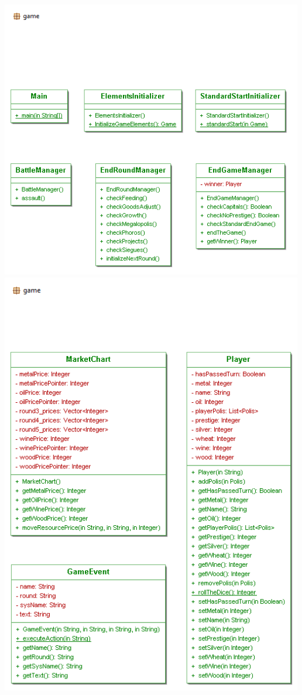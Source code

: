 \documentclass[11 pt]{book}
\begin{document}
\begin{center}
        \includegraphics[width=500px]{design-uml/game-main-managers.png}
        \includegraphics[width=500px]{design-uml/game-martket-gameevent-player.png}

\end{center}
\end{document}
